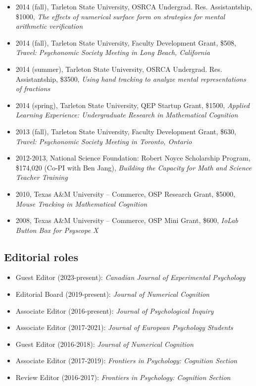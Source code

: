 \documentclass[article,10pt]{article}
\begin{document}
\begin{itemize}
\item 2014 (fall), Tarleton State University, OSRCA Undergrad. Res. Assistantship, \$1000, \emph{The effects of numerical surface form on strategies for mental arithmetic verification}
\item 2014 (fall), Tarleton State University, Faculty Development Grant, \$508, \emph{Travel: Psychonomic Society Meeting in Long Beach, California}
\item 2014 (summer), Tarleton State University, OSRCA Undergrad. Res. Assistantship, \$3500, \emph{Using hand tracking to analyze mental representations of fractions}
\item 2014 (spring), Tarleton State University, QEP Startup Grant, \$1500, \emph{Applied Learning Experience: Undergraduate Research in Mathematical Cognition}
\item 2013 (fall), Tarleton State University, Faculty Development Grant, \$630, \emph{Travel: Psychonomic Society Meeting in Toronto, Ontario}
\item 2012-2013, National Science Foundation: Robert Noyce Scholarship Program, \$174,020 (Co-PI with Ben Jang), \emph{Building the Capacity for Math and Science Teacher Training}
\item 2010, Texas A\&M University – Commerce, OSP Research Grant, \$5000, \emph{Mouse Tracking in Mathematical Cognition}
\item 2008, Texas A\&M University – Commerce, OSP Mini Grant, \$600, \emph{IoLab Button Box for Psyscope X}
\end{itemize}

\subsection*{Editorial roles}
\label{sec:org9f4f62f}
\begin{itemize}
\item Guest Editor (2023-present): \emph{Canadian Journal of Experimental Psychology}
\item Editorial Board (2019-present): \emph{Journal of Numerical Cognition}
\item Associate Editor (2016-present): \emph{Journal of Psychological Inquiry}
\item Associate Editor (2017-2021): \emph{Journal of European Psychology Students}
\item Guest Editor (2016-2018): \emph{Journal of Numerical Cognition}
\item Associate Editor (2017-2019): \emph{Frontiers in Psychology: Cognition Section}
\item Review Editor (2016-2017): \emph{Frontiers in Psychology: Cognition Section}
\end{itemize}
\end{document}
